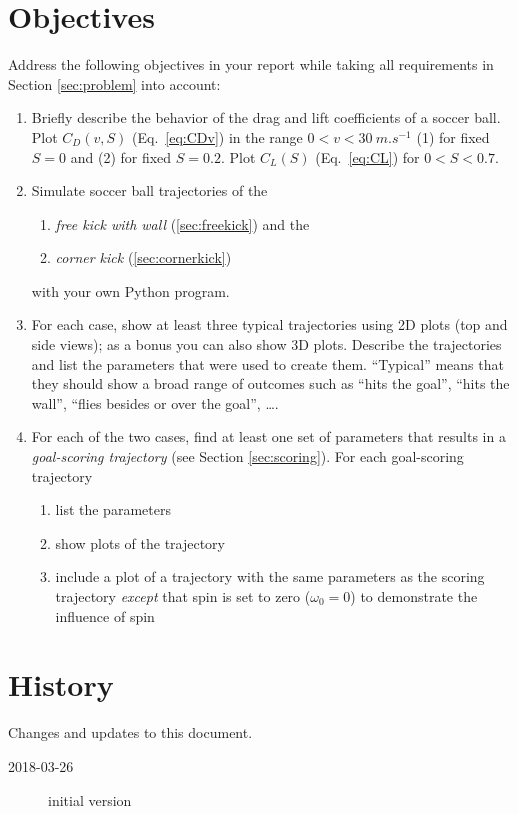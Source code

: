 \documentclass[letterpaper]{scrartcl}
\newenvironment{enuma}{\begin{enumerate}[label=(\alph*)]}{\end{enumerate}}
\newenvironment{enumi}{\begin{enumerate}[label=(\roman*)]}{\end{enumerate}}
\begin{document}
\section{Objectives}
\label{sec:tasks}
Address the following objectives in your report while taking all
requirements in Section \ref{sec:problem} into account:
\begin{enuma}
\item Briefly describe the behavior of the drag and lift coefficients
  of a soccer ball. Plot $C_{D}(v, S)$ (Eq.~\ref{eq:CDv}) in the range
  $0 < v < \SI{30}{m.s^{-1}}$ (1) for fixed $S=0$ and (2) for fixed
  $S=0.2$. Plot $C_{L}(S)$ (Eq.~\ref{eq:CL}) for $0 < S < 0.7$.
\item Simulate soccer ball trajectories of the
  \begin{enumi}
  \item \emph{free kick with wall} (\ref{sec:freekick}) and the
  \item \emph{corner kick} (\ref{sec:cornerkick})    
  \end{enumi}
 with your own Python program. 
\item For each case, show at least three typical trajectories using 2D
  plots (top and side views); as a bonus you can also show 3D
  plots. Describe the trajectories and list the parameters that were
  used to create them. ``Typical'' means that they should show a broad
  range of outcomes such as ``hits the goal'', ``hits the wall'',
  ``flies besides or over the goal'', \dots.
\item For each of the two cases, find at least one set of parameters
  that results in a \emph{goal-scoring trajectory} (see Section
  \ref{sec:scoring}). For each goal-scoring trajectory
  \begin{enumi}    
  \item list the parameters
  \item show plots of the trajectory
  \item include a plot of a trajectory with the same parameters as the
    scoring trajectory \emph{except} that spin is set to zero
    ($\omega_{0} = 0$) to demonstrate the influence of spin
  \end{enumi}
\end{enuma}

\section{History}
\label{sec:history}

Changes and updates to this document.
\begin{description}
\item[2018-03-26] initial version
\end{description}
  
\end{document}
